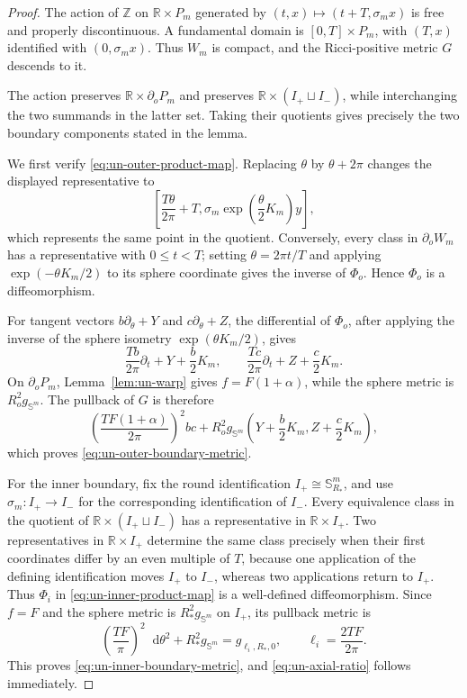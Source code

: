\documentclass[11pt,reqno]{amsart}
\theoremstyle{definition}
\numberwithin{equation}{section}
\newcommand{\dd}{\mathop{}\!\mathrm d}
\begin{document}
\begin{proof}
The action of \(\mathbb Z\) on \(\mathbb R\times P_m\) generated by
\((t,x)\mapsto(t+T,\sigma_m x)\) is free and properly discontinuous.
A fundamental domain is \([0,T]\times P_m\), with
\((T,x)\) identified with \((0,\sigma_m x)\).  Thus \(W_m\) is compact,
and the Ricci-positive metric \(G\) descends to it.

The action preserves \(\mathbb R\times\partial_oP_m\) and preserves
\(\mathbb R\times(I_+\sqcup I_-)\), while interchanging the two summands
in the latter set.  Taking their quotients gives precisely the two
boundary components stated in the lemma.

We first verify \eqref{eq:un-outer-product-map}.  Replacing \(\theta\) by
\(\theta+2\pi\)
changes the displayed representative to
\[
 \left[\frac{T\theta}{2\pi}+T,
   \sigma_m\exp\left(\frac\theta2K_m\right)y\right],
\]
which represents the same point in the quotient.  Conversely, every
class in \(\partial_oW_m\) has a representative with \(0\le t<T\);
setting \(\theta=2\pi t/T\) and applying
\(\exp(-\theta K_m/2)\) to its sphere coordinate gives the inverse of
\(\Phi_o\).  Hence \(\Phi_o\) is a diffeomorphism.

For tangent vectors \(b\partial_\theta+Y\) and
\(c\partial_\theta+Z\), the differential of
\(\Phi_o\), after applying the inverse of the
sphere isometry \(\exp(\theta K_m/2)\), gives
\[
 \frac{Tb}{2\pi}\partial_t+Y+\frac b2K_m,
 \qquad
 \frac{Tc}{2\pi}\partial_t+Z+\frac c2K_m.
\]
On \(\partial_oP_m\), Lemma~\ref{lem:un-warp} gives
\(f=F(1+\alpha)\), while the sphere metric is
\(R_o^2g_{\mathbb S^m}\).  The pullback of \(G\) is therefore
\[
 \left(\frac{TF(1+\alpha)}{2\pi}\right)^2bc
 +R_o^2g_{\mathbb S^m}
   \left(Y+\frac b2K_m,Z+\frac c2K_m\right),
\]
which proves \eqref{eq:un-outer-boundary-metric}.

For the inner boundary, fix the round identification
\(I_+\cong\mathbb S^m_{R_*}\), and use \(\sigma_m:I_+\to I_-\) for the
corresponding identification of \(I_-\).  Every equivalence class in
the quotient of \(\mathbb R\times(I_+\sqcup I_-)\) has a representative
in \(\mathbb R\times I_+\).  Two representatives in
\(\mathbb R\times I_+\) determine the same class precisely when their
first coordinates differ by an even multiple of \(T\), because one
application of the defining identification moves \(I_+\) to \(I_-\),
whereas two applications return to \(I_+\).  Thus \(\Phi_i\) in
\eqref{eq:un-inner-product-map} is a well-defined
diffeomorphism.  Since \(f=F\) and the sphere metric is
\(R_*^2g_{\mathbb S^m}\) on \(I_+\), its pullback metric is
\[
 \left(\frac{TF}{\pi}\right)^2\dd\theta^2
   +R_*^2g_{\mathbb S^m}=g_{\ell_i,R_*,0},
 \qquad \ell_i=\frac{2TF}{2\pi}.
\]
This proves \eqref{eq:un-inner-boundary-metric}, and
\eqref{eq:un-axial-ratio} follows immediately.


\end{proof}
\end{document}
